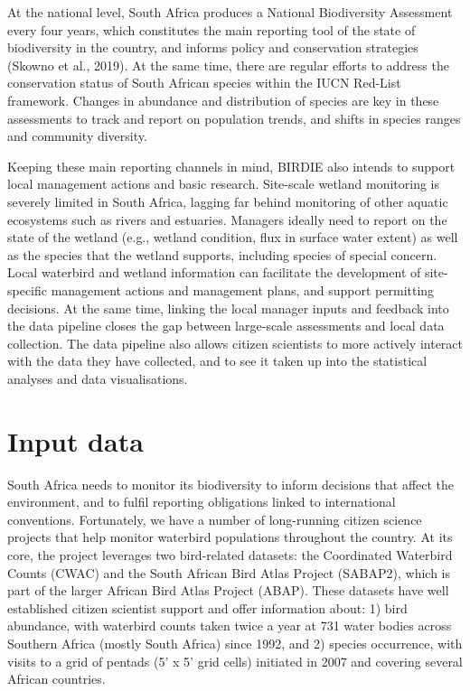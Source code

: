 \documentclass[utf8]{frontiersSCNS}
\begin{document}
At the national level, South Africa produces a National Biodiversity
Assessment every four years, which constitutes the main reporting tool
of the state of biodiversity in the country, and informs policy and
conservation strategies (Skowno et al., 2019). At the same time, there
are regular efforts to address the conservation status of South African
species within the IUCN Red-List framework. Changes in abundance and
distribution of species are key in these assessments to track and report
on population trends, and shifts in species ranges and community
diversity.

Keeping these main reporting channels in mind, BIRDIE also intends to
support local management actions and basic research. Site-scale wetland
monitoring is severely limited in South Africa, lagging far behind
monitoring of other aquatic ecosystems such as rivers and estuaries.
Managers ideally need to report on the state of the wetland (e.g.,
wetland condition, flux in surface water extent) as well as the species
that the wetland supports, including species of special concern. Local
waterbird and wetland information can facilitate the development of
site-specific management actions and management plans, and support
permitting decisions. At the same time, linking the local manager inputs
and feedback into the data pipeline closes the gap between large-scale
assessments and local data collection. The data pipeline also allows
citizen scientists to more actively interact with the data they have
collected, and to see it taken up into the statistical analyses and data
visualisations.

\hypertarget{input-data}{%
\section*{Input data}\label{input-data}}

South Africa needs to monitor its biodiversity to inform decisions that
affect the environment, and to fulfil reporting obligations linked to
international conventions. Fortunately, we have a number of long-running
citizen science projects that help monitor waterbird populations
throughout the country. At its core, the project leverages two
bird-related datasets: the Coordinated Waterbird Counts (CWAC) and the
South African Bird Atlas Project (SABAP2), which is part of the larger
African Bird Atlas Project (ABAP). These datasets have well established
citizen scientist support and offer information about: 1) bird
abundance, with waterbird counts taken twice a year at 731 water bodies
across Southern Africa (mostly South Africa) since 1992, and 2) species
occurrence, with visits to a grid of pentads (5' x 5' grid cells)
initiated in 2007 and covering several African countries.
\end{document}
